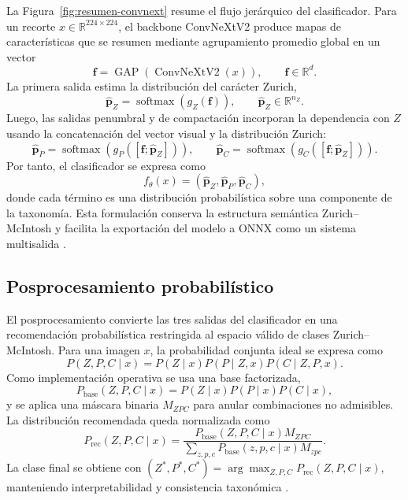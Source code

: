 La Figura~\ref{fig:resumen-convnext} resume el flujo jerárquico del clasificador. Para un recorte $x\in\mathbb{R}^{224\times224}$, el backbone ConvNeXtV2 produce mapas de características que se resumen mediante agrupamiento promedio global en un vector
\begin{equation}
\mathbf{f}=\operatorname{GAP}(\operatorname{ConvNeXtV2}(x)), \qquad \mathbf{f}\in\mathbb{R}^{d}.
\end{equation}
La primera salida estima la distribución del carácter Zurich,
\begin{equation}
\hat{\mathbf{p}}_Z=\operatorname{softmax}(g_Z(\mathbf{f})), \qquad \hat{\mathbf{p}}_Z\in\mathbb{R}^{n_Z}.
\end{equation}
Luego, las salidas penumbral y de compactación incorporan la dependencia con $Z$ usando la concatenación del vector visual y la distribución Zurich:
\begin{equation}
\hat{\mathbf{p}}_P=\operatorname{softmax}(g_P([\mathbf{f};\hat{\mathbf{p}}_Z])), \qquad
\hat{\mathbf{p}}_C=\operatorname{softmax}(g_C([\mathbf{f};\hat{\mathbf{p}}_Z])).
\end{equation}
Por tanto, el clasificador se expresa como
\begin{equation}
f_\theta(x)=\left(\hat{\mathbf{p}}_Z,\hat{\mathbf{p}}_P,\hat{\mathbf{p}}_C\right),
\end{equation}
donde cada término es una distribución probabilística sobre una componente de la taxonomía. Esta formulación conserva la estructura semántica Zurich--McIntosh y facilita la exportación del modelo a ONNX como un sistema multisalida \citep{woo2023convnextv2,mcintosh1990classification}.

\subsection{Posprocesamiento probabilístico}

El posprocesamiento convierte las tres salidas del clasificador en una recomendación probabilística restringida al espacio válido de clases Zurich--McIntosh. Para una imagen $x$, la probabilidad conjunta ideal se expresa como
\begin{equation}
P(Z,P,C\mid x)=P(Z\mid x)P(P\mid Z,x)P(C\mid Z,P,x).
\end{equation}
Como implementación operativa se usa una base factorizada,
\begin{equation}
P_{\mathrm{base}}(Z,P,C\mid x)=P(Z\mid x)P(P\mid x)P(C\mid x),
\end{equation}
y se aplica una máscara binaria $M_{ZPC}$ para anular combinaciones no admisibles. La distribución recomendada queda normalizada como
\begin{equation}
P_{\mathrm{rec}}(Z,P,C\mid x)=
\frac{P_{\mathrm{base}}(Z,P,C\mid x)M_{ZPC}}
{\sum_{z,p,c}P_{\mathrm{base}}(z,p,c\mid x)M_{zpc}}.
\end{equation}
La clase final se obtiene con $(Z^\ast,P^\ast,C^\ast)=\arg\max_{Z,P,C}P_{\mathrm{rec}}(Z,P,C\mid x)$, manteniendo interpretabilidad y consistencia taxonómica \citep{mcintosh1990classification,sayez2023sunscc}.

